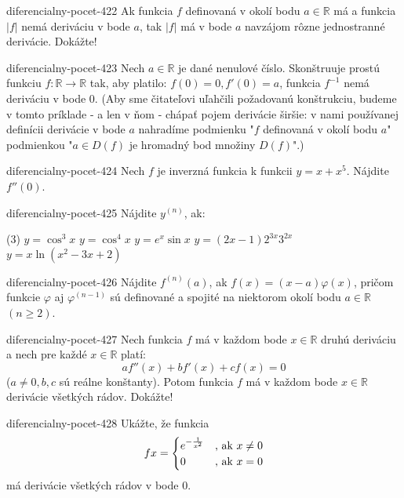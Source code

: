 \begin{defproblem}{diferencialny-pocet-422}
Ak funkcia $f$ definovaná v okolí bodu $a\in\mathbb{R}$ má a funkcia $|f|$ nemá
deriváciu v bode $a$, tak $|f|$ má v bode $a$ navzájom rôzne jednostranné
derivácie. Dokážte!
\end{defproblem}

\begin{defproblem}{diferencialny-pocet-423}
Nech $a\in\mathbb{R}$ je dané nenulové číslo. Skonštruuje prostú funkciu
$f:\mathbb{R}\rightarrow\mathbb{R}$ tak, aby platilo: $f(0)=0,f'(0)=a$, funkcia
$f^{-1}$ nemá deriváciu v bode $0$. (Aby sme čitateľovi uľahčili požadovanú
konštrukciu, budeme v tomto príklade - a len v ňom - chápať pojem derivácie
širšie: v nami používanej definícii derivácie v bode $a$ nahradíme podmienku
"$f$ definovaná v okolí bodu $a$" podmienkou "$a\in D(f)$ je hromadný bod
množiny $D(f)$".)
\end{defproblem}

\begin{defproblem}{diferencialny-pocet-424}
Nech $f$ je inverzná funkcia k funkcii $y=x+x^5$. Nájdite $f''(0)$.
\end{defproblem}

\begin{defproblem}{diferencialny-pocet-425}
Nájdite $y^{(n)}$, ak:
\begin{tasks}(3)
  \task $y=\cos^3 x$
  \task $y=\cos^4 x$
  \task $y=e^x \sin x$
  \task $y=(2x-1)2^{3x}3^{2x}$
  \task* $y=x\ln (x^2-3x+2)$
\end{tasks}
\end{defproblem}

\begin{defproblem}{diferencialny-pocet-426}
Nájdite $f^{(n)}(a)$, ak $f(x)=(x-a)\varphi (x)$, pričom funkcie $\varphi$ aj
$\varphi^{(n-1)}$ sú definované a spojité na niektorom okolí bodu
$a\in\mathbb{R}$ $(n\geq 2)$.
\end{defproblem}

\begin{defproblem}{diferencialny-pocet-427}
Nech funkcia $f$ má v každom bode $x\in\mathbb{R}$ druhú deriváciu a nech pre
každé $x\in\mathbb{R}$ platí:
\[
  af''(x)+bf'(x)+cf(x)=0
\]
($a\neq 0,b,c$ sú reálne konštanty). Potom funkcia $f$ má v každom bode
$x\in\mathbb{R}$ derivácie všetkých rádov. Dokážte!
\end{defproblem}

\begin{defproblem}{diferencialny-pocet-428}
Ukážte, že funkcia
\[
  f{x}=
    \begin{cases}
      e^{-\frac{1}{x^2}} & $, ak $ x \neq 0 \\
      0 &  $, ak $ x=0
    \end{cases}
\]
má derivácie všetkých rádov v bode $0$.
\end{defproblem}

